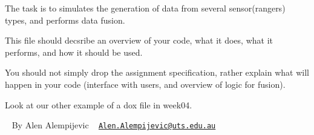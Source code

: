 The task is to simulates the generation of data from several sensor(rangers) types, and performs data fusion.

This file should decsribe an overview of your code, what it does, what it performs, and how it should be used.

You should not simply drop the assignment specification, rather explain what will happen in your code (interface with users, and overview of logic for fusion).

Look at our other example of a dox file in week04.

~\newline
 By Alen Alempijevic ~\newline
 \href{mailto:Alen.Alempijevic@uts.edu.au}{\tt Alen.\+Alempijevic@uts.\+edu.\+au} 